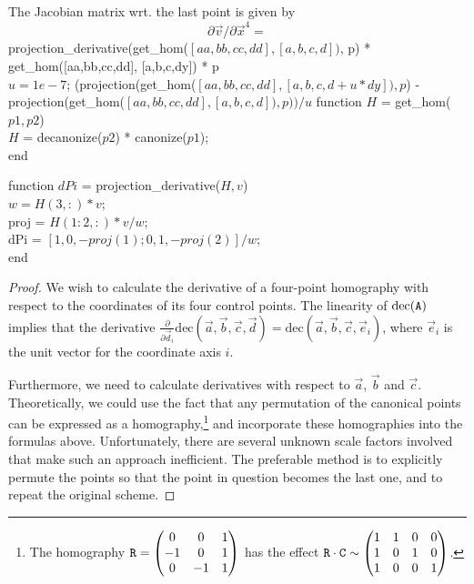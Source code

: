 The Jacobian matrix wrt. the last point is given by
\begin{equation}
\partial \vec v / \partial \vec x^4 = 
\end{equation}
projection\_derivative(get\_hom($[aa,bb,cc,dd], [a,b,c,d])$, p) * get\_hom([aa,bb,cc,dd], [a,b,c,dy]) * p\\
$u=1e-7$; (projection(get\_hom($[aa,bb,cc,dd], [a,b,c,d+u*dy]), p$) - projection(get\_hom($[aa,bb,cc,dd], [a,b,c,d]), p)) / u$
function $H$ = get\_hom($p1,p2$)\\
 $H$ = decanonize($p2$) * canonize($p1$);\\
end

function $dPi$ = projection\_derivative($H, v$)\\
 $w = H(3,:) * v$;\\
 proj = $H(1:2,:) * v / w$;\\
 dPi = $[1, 0, -proj(1); 0, 1, -proj(2)] / w$;\\
end

\begin{proof}
We wish to calculate the derivative of a four-point homography with respect to the coordinates of its four control points.
The linearity of $\mathrm{dec}(\mathtt{A})$ implies that the derivative $\frac{\partial} {\partial \vec d_i} \mathrm{dec} \left( \vec a, \vec b, \vec c, \vec d \right) = \mathrm{dec} \left( \vec a, \vec b, \vec c, \vec e_i \right)$, where $\vec e_i$ is the unit vector for the coordinate axis $i$.

Furthermore, we need to calculate derivatives with respect to $\vec a$, $\vec b$ and $\vec c$.
Theoretically, we could use the fact that any permutation of the canonical points can be expressed as a homography,\footnote{
The homography $\mathtt{R} = \begin{pmatrix}
 0 & 0 & 1 \\
 -1 & 0 & 1 \\
 0 & -1 & 1
 \end{pmatrix}$ has the effect $\mathtt{R} \cdot \mathtt{C} \sim \begin{pmatrix}
 1 & 1 & 0 & 0 \\
 1 & 0 & 1 & 0 \\
 1 & 0 & 0 & 1
 \end{pmatrix}$.
} and incorporate these homographies into the formulas above.
Unfortunately, there are several unknown scale factors involved that make such an approach inefficient.
The preferable method is to explicitly permute the points so that the point in question becomes the last one, and to repeat the original scheme.
\end{proof}

